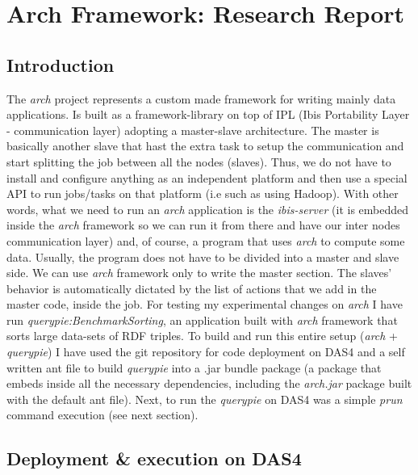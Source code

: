 \section{Arch Framework: Research Report}

\subsection{Introduction}

The \textit{arch} project represents a custom made framework for writing mainly data applications. Is built as a framework-library on top of IPL (Ibis Portability Layer - communication layer) adopting a master-slave architecture. The master is basically another slave that hast the extra task to setup the communication and start splitting the job between all the nodes (slaves). Thus, we do not have to install and configure anything as an independent platform and then use a special API to run jobs/tasks on that platform (i.e such as using Hadoop). With other words, what we need to run an \textit{arch} application is the \textit{ibis-server} (it is embedded inside the \textit{arch} framework so we can run it from there and have our inter nodes communication layer) and, of course, a program that uses \textit{arch} to compute some data. Usually, the program does not have to be divided into a master and slave side. We can use \textit{arch} framework only to write the master section. The slaves' behavior is automatically dictated by the list of actions that we add in the master code, inside the job. For testing my experimental changes on \textit{arch} I have run \textit{querypie:BenchmarkSorting}, an application built with \textit{arch} framework that sorts large data-sets of RDF triples. To build and run this entire setup (\textit{arch} + \textit{querypie}) I have used the git repository for code deployment on DAS4 and a self written ant file \cite{build_file} to build \textit{querypie} into a .jar bundle package (a package that embeds inside all the necessary dependencies, including the \textit{arch.jar} package built with the default ant file). Next, to run the \textit{querypie} on DAS4 was a simple \textit{prun} command execution (see next section).

% 
\subsection{Deployment \& execution on DAS4}

